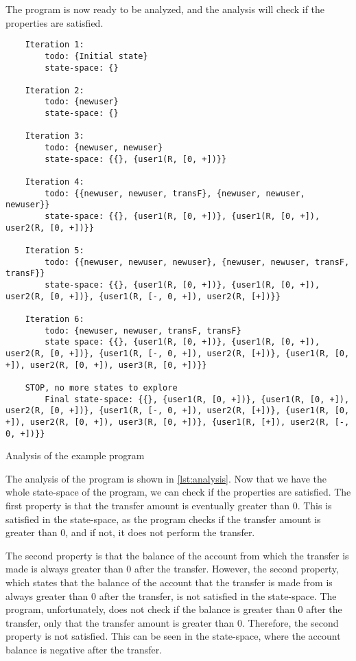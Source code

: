 The program is now ready to be analyzed, and the analysis will check if the properties are satisfied.


\begin{listing}[htb!]
    \begin{verbatim}
    Iteration 1:
        todo: {Initial state}
        state-space: {}

    Iteration 2:
        todo: {newuser}
        state-space: {}

    Iteration 3:
        todo: {newuser, newuser}
        state-space: {{}, {user1(R, [0, +])}}

    Iteration 4:
        todo: {{newuser, newuser, transF}, {newuser, newuser, newuser}}
        state-space: {{}, {user1(R, [0, +])}, {user1(R, [0, +]), user2(R, [0, +])}}

    Iteration 5:
        todo: {{newuser, newuser, newuser}, {newuser, newuser, transF, transF}}
        state-space: {{}, {user1(R, [0, +])}, {user1(R, [0, +]), user2(R, [0, +])}, {user1(R, [-, 0, +]), user2(R, [+])}}

    Iteration 6:
        todo: {newuser, newuser, transF, transF}
        state space: {{}, {user1(R, [0, +])}, {user1(R, [0, +]), user2(R, [0, +])}, {user1(R, [-, 0, +]), user2(R, [+])}, {user1(R, [0, +]), user2(R, [0, +]), user3(R, [0, +])}}

    STOP, no more states to explore
        Final state-space: {{}, {user1(R, [0, +])}, {user1(R, [0, +]), user2(R, [0, +])}, {user1(R, [-, 0, +]), user2(R, [+])}, {user1(R, [0, +]), user2(R, [0, +]), user3(R, [0, +])}, {user1(R, [+]), user2(R, [-, 0, +])}}
    \end{verbatim}
    \caption{Analysis of the example program}
    \label{lst:analysis}
\end{listing}


The analysis of the program is shown in \autoref{lst:analysis}.
Now that we have the whole state-space of the program, we can check if the properties are satisfied.
The first property is that the transfer amount is eventually greater than 0.
This is satisfied in the state-space, as the program checks if the transfer amount is greater than 0, and if not, it does not perform the transfer.

The second property is that the balance of the account from which the transfer is made is always greater than 0 after the transfer.
However, the second property, which states that the balance of the account that the transfer is made from is always greater than 0 after the transfer, is not satisfied in the state-space.
The program, unfortunately, does not check if the balance is greater than 0 after the transfer, only that the transfer amount is greater than 0.
Therefore, the second property is not satisfied.
This can be seen in the state-space, where the account balance is negative after the transfer.
